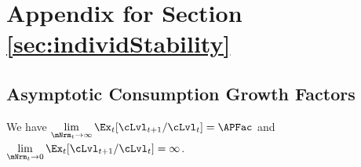 \documentclass[\econtexRoot/BufferStockTheory]{subfiles}
\begin{document}

\hypertarget{ApndxMTargetIsStable}{}
\section{Appendix for Section \ref{sec:individStability}}\label{sec:ApndxMTargetIsStable}

\subsection{Asymptotic Consumption Growth Factors}\label{subsec:AppxCgrowthFac}

\begin{proposition}\label{prop:convgGrowth}\hypertarget{LimitsAsmtToZero}{}
  We have $\lim\limits_{\mNrm_{t} \rightarrow \infty} \Ex_{t}[\cLvl_{t+1}/\cLvl_{t}] =  {\APFac}$ and $\lim\limits_{\mNrm_{t} \rightarrow  0} \Ex_{t}[\cLvl_{t+1}/\cLvl_{t}] =  \infty$. 
\end{proposition}
\end{document}
